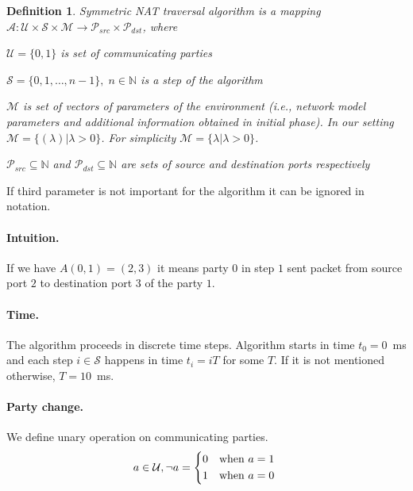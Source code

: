 \documentclass[twoside]{article}
\newtheorem{mydef}{Definition}
\begin{document}
\begin{multicols}{2}
\begin{mydef}
Symmetric NAT traversal algorithm is a mapping 
$\mathcal{A}: \mathcal{U} \times \mathcal{S} \times \mathcal{M} \rightarrow \mathcal{P}_{src} \times \mathcal{P}_{dst}$, 
where \\
\begin{compactitem}
\item $\mathcal{U}=\{0,1\}$ is set of communicating parties
\item $\mathcal{S} = \{0, 1, \dots, n-1\}, \; n \in \mathbb{N}$ is a step of the algorithm
\item $\mathcal{M}$ is set of vectors of parameters of the environment (i.e., network model 
parameters and additional information obtained in initial phase). 
In our setting $\mathcal{M} = \{ (\lambda) | \lambda > 0 \}$. For simplicity $\mathcal{M} = \{ \lambda | \lambda > 0 \}$.
\item $\mathcal{P}_{src} \subseteq \mathbb{N}$ and $\mathcal{P}_{dst} \subseteq \mathbb{N}$
are sets of source and destination ports respectively
\end{compactitem}
\end{mydef}
If third parameter is not important for the algorithm it can be ignored in notation.

\paragraph{Intuition.} 
If we have $A(0,1) = (2,3)$ it means party $0$ in step $1$ sent packet from source port $2$ to destination port $3$
of the party $1$.

\paragraph{Time.} 
The algorithm proceeds in discrete time steps. Algorithm starts in time $t_0 = 0$~ms and each step $i \in \mathcal{S}$
happens in time $t_i = iT$ for some $T$. If it is not mentioned otherwise, $T = 10$~ms.

\paragraph{Party change.} 
We define unary operation on communicating parties. 
\[
a \in \mathcal{U},  \neg a = \begin{dcases*}
         0 & when $a=1$\\
         1 & when $a=0$
        \end{dcases*}
\]


\end{multicols}
\end{document}
